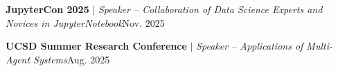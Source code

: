 \resumeSubHeadingListStart
    \vspace{4pt}
    \resumeProjectHeading
      {\textbf{JupyterCon 2025} $|$ \emph{Speaker -- Collaboration of Data Science Experts and Novices in JupyterNotebook}}{Nov. 2025}
      
    \resumeProjectHeading
      {\textbf{UCSD Summer Research Conference} $|$ \emph{Speaker -- Applications of Multi-Agent Systems}}{Aug. 2025}
\resumeSubHeadingListEnd
